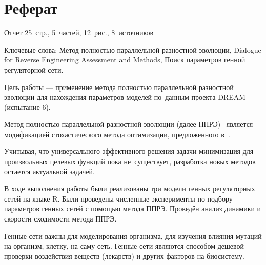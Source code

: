 \chapter*{Реферат}							%

Отчет 25~стр., 5~частей, 12~рис., 8~источников

Ключевые слова: Метод полностью параллельной разностной эволюции, Dialogue for 
Reverse Engineering Assessment and Methods, Поиск параметров генной регуляторной 
сети.

Цель работы — применение метода полностью параллельной разностной эволюции для 
нахождения параметров моделей по~данным проекта DREAM (испытание 6).

Метод полностью параллельной разностной эволюции (далее ППРЭ)~\cite{bib2,bib5} 
является модификацией стохастического метода оптимизации, предложенного 
в~\cite{bib1}. 

Учитывая, что универсального эффективного решения задачи минимизация для 
произвольных целевых функций пока не~существует, разработка новых методов 
остается актуальной задачей. 

В ходе выполнения работы были реализованы три модели генных регуляторных сетей
на языке R. Были проведены численные эксперименты по подбору параметров генных
сетей с помощью метода ППРЭ. Проведён анализ динамики и скорости сходимости 
метода ППРЭ.

Генные сети важны для моделирования организма, для изучения влияния
мутаций на организм, клетку, на саму сеть. Генные сети являются способом дешевой
проверки воздействия веществ (лекарств) и других факторов на биосистему.

\clearpage
